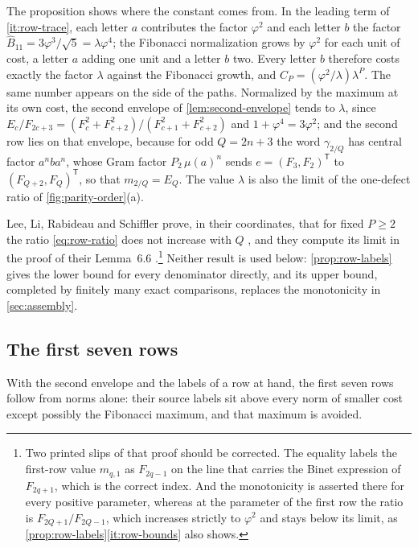 The proposition shows where the constant comes from. In the leading
term of \ref{it:row-trace}, each letter $a$ contributes the factor $\varphi^2$ and each
letter $b$ the factor $\widehat B_{11}=3\varphi^3/\sqrt5=\lambda\varphi^4$; the
Fibonacci normalization grows by $\varphi^2$ for each unit of cost, a letter $a$
adding one unit and a letter $b$ two. Every letter $b$ therefore costs
exactly the factor $\lambda$ against the Fibonacci growth, and
$C_P=(\varphi^2/\lambda)\lambda^P$. The same number appears on the side of the
paths. Normalized by the maximum at its own cost, the second envelope of
\cref{lem:second-envelope} tends to $\lambda$, since
$E_c/F_{2c+3}=(F_c^2+F_{c+2}^2)/(F_{c+1}^2+F_{c+2}^2)$ and $1+\varphi^4=3\varphi^2$;
and the second row lies on that envelope, because for odd $Q=2n+3$ the
word $\gamma_{2/Q}$ has central factor $a^nba^n$, whose Gram factor
$P_2\,\mu(a)^n$ sends $e=(F_3,F_2)^{\mathsf T}$ to $(F_{Q+2},F_Q)^{\mathsf T}$, so
that $m_{2/Q}=E_Q$. The value $\lambda$ is also the limit of the one-defect
ratio of \cref{fig:parity-order}(a).

Lee, Li, Rabideau and Schiffler prove, in their coordinates, that for fixed
$P\geqslant2$ the ratio \eqref{eq:row-ratio} does not increase with $Q$
\cite[Lemma~6.4]{LeeEtAl2023}, and they compute its limit in the proof of
their Lemma~6.6 \cite[equation~(6.4)]{LeeEtAl2023}.\footnote{Two printed slips
of that proof should be corrected. The equality labels the first-row value
$m_{q,1}$ as $F_{2q-1}$ on the line that carries the Binet expression of
$F_{2q+1}$, which is the correct index. And the monotonicity is asserted there
for every positive parameter, whereas at the parameter of the first row the
ratio is $F_{2Q+1}/F_{2Q-1}$, which increases strictly to $\varphi^2$ and stays
below its limit, as \cref{prop:row-labels}\ref{it:row-bounds} also shows.}
Neither result is used below: \cref{prop:row-labels} gives the lower bound
for every denominator directly, and its upper bound, completed by finitely
many exact comparisons, replaces the monotonicity in \cref{sec:assembly}.

\subsection{The first seven rows}

With the second envelope and the labels of a row at hand, the first seven
rows follow from norms alone: their source labels sit above every norm of
smaller cost except possibly the Fibonacci maximum, and that maximum is
avoided.

